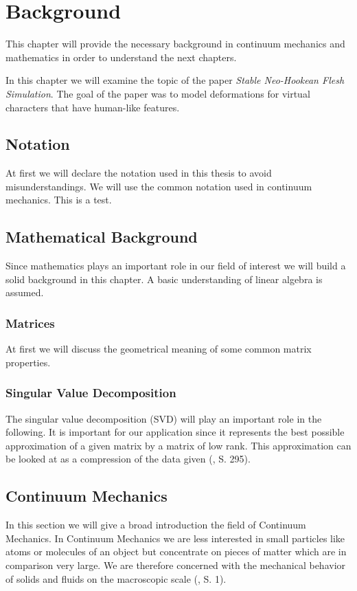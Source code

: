\chapter{Background} \label{c:Background}
This chapter will provide the necessary background in continuum mechanics and mathematics in order to understand the next chapters.

In this chapter we will examine the topic of the paper \textit{Stable Neo-Hookean Flesh Simulation}. The goal of the paper was to model deformations for virtual characters that have human-like features.


\section{Notation}
At first we will declare the notation used in this thesis to avoid misunderstandings. We will use the common notation used in continuum mechanics.
This is a test.

\section{Mathematical Background}

Since mathematics plays an important role in our field of interest we will build a solid background in this chapter. A basic understanding of linear algebra is assumed.

\subsection{Matrices}
At first we will discuss the geometrical meaning of some common matrix properties.


\subsection{Singular Value Decomposition}

The singular value decomposition (SVD) will play an important role in the following. It is important for our application since it represents the best possible approximation of a given matrix by a matrix of low rank. This approximation can be looked at as a compression of the data given (\cite{LiesenMehrmann2015}, S. 295).

\section{Continuum Mechanics}
In this section we will give a broad introduction the field of Continuum Mechanics.
In Continuum Mechanics we are less interested in small particles like atoms or molecules of an object but concentrate on pieces of matter which are in comparison very large. We are therefore concerned with the mechanical behavior of solids and fluids on the macroscopic scale (\cite{Spencer1980}, S. 1).


